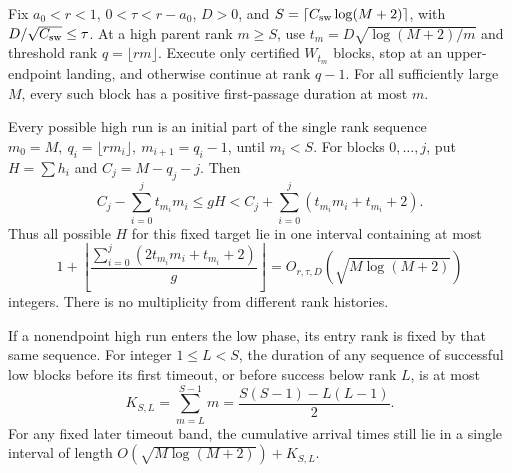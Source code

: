 \begin{proposition}
\label{prop:Shaik-time-corridor}
Fix \(a_0<r<1\), \(0<\tau<r-a_0\), \(D>0\), and
\(S=\lceil C_{\rm sw}\log(M+2)\rceil\), with
\(D/\sqrt{C_{\rm sw}}\le\tau\).
At a high parent rank \(m\ge S\), use
\(t_m=D\sqrt{\log(M+2)/m}\) and threshold rank \(q=\lfloor rm\rfloor\).
Execute only certified \(W_{t_m}\) blocks, stop at an upper-endpoint
landing, and otherwise continue at rank \(q-1\).
For all sufficiently large \(M\), every such block has a positive
first-passage duration at most \(m\).

Every possible high run is an initial part of the single rank sequence
\(m_0=M,\ q_i=\lfloor rm_i\rfloor,\ m_{i+1}=q_i-1\), until \(m_i<S\).
For blocks \(0,\ldots,j\), put \(H=\sum h_i\) and \(C_j=M-q_j-j\).
Then
\begin{equation}\label{eq:Shaik-one-sided-corridor}
 C_j-\sum_{i=0}^j t_{m_i}m_i
 \le gH<
 C_j+\sum_{i=0}^j(t_{m_i}m_i+t_{m_i}+2).
\end{equation}
Thus all possible \(H\) for this fixed target lie in one interval
containing at most
\[
 1+\left\lfloor
 \frac{\sum_{i=0}^j(2t_{m_i}m_i+t_{m_i}+2)}{g}
 \right\rfloor
 =O_{r,\tau,D}(\sqrt{M\log(M+2)})
\]
integers. There is no multiplicity from different rank histories.

If a nonendpoint high run enters the low phase, its entry rank is
fixed by that same sequence. For integer \(1\le L<S\), the duration
of any sequence of successful low blocks before its first timeout,
or before success below rank \(L\), is at most
\begin{equation}\label{eq:Shaik-low-triangle}
 K_{S,L}=\sum_{m=L}^{S-1}m
 =\frac{S(S-1)-L(L-1)}2.
\end{equation}
For any fixed later timeout band, the cumulative arrival times still
lie in a single interval of length
\(O(\sqrt{M\log(M+2)})+K_{S,L}\).
\end{proposition}
